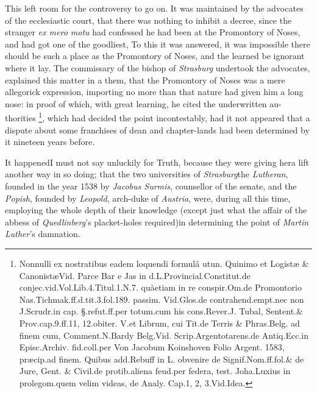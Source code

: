 \documentclass{article}
\begin{document}
This left room for the controversy to go on. It was maintained by the advocates
of the ecclesiastic court, that there was nothing to inhibit a decree, since
the stranger \textit{ex mero motu} had confessed he had been at the Promontory of
Noses, and had got one of the goodliest, \etc\etc\break
\tsk To this
it was answered, it was impossible there should be such a place as the
Promontory of Noses, and the learned be ignorant where it lay. The commissary
of the bishop of \textit{Strasburg} undertook the\pb
advocates, explained this matter in a\break
{}
them, that the Promontory of Noses was
a mere allegorick expression, importing no more than that nature
had given him a long nose: in proof of which, with great learning, he cited the
underwritten au-\break
thorities \footnote{Nonnulli ex nostratibus eadem loquendi
formulâ utun. Quinimo et Logistæ \& Canonistæ\tsh Vid.\@
Parce Bar e Jas in d.\@ L.\@ Provincial.Constitut.\break de
conjec.\@ vid.\@ Vol.\@ Lib.\@ 4.\@ Titul.\@ 1.\@ N.\@ 7.\@
quà\break etiam in re conspir.\@ Om.\@ de Promontorio
Nas.\break Tichmak.\@ ff.\@ d.\@ tit.\@ 3.\@ fol.\@ 189.\@
passim. Vid.\@ Glos.\break de contrahend.\@ empt.\etc nec
non J.\@ Scrudr.\@ in cap.\break 
§.\@ refut.\@ ff.\@ per totum.\@ cum his cons.\@ Rever.\@ J.\break
Tubal, Sentent.\@ \& Prov.\@ cap.\@ 9.\@ ff.\@ 11, 12.\@ obiter.\break  
V.\@ et Librum, cui Tit.\@ de Terris \& Phras.\@ Belg.\break
ad finem cum, Comment.\@ N.\@ Bardy Belg.\@ Vid.\break
Scrip.\@ Argentotarens.\@ de Antiq.\@ Ecc.\@ in Episc.\@ Ar\-chiv.\@
fid.\@ coll.\@ per Von Jacobum Koinshoven Folio Argent.\@
1583, præcip.\@ ad finem.  Quibus add.\@ Rebuff in L.\@
obvenire de Signif.\@ Nom.\@ ff.\@ fol.\@ \& de Jure, Gent.\@
\& Civil.\@ de protib.\@ aliena feud.\@ per federa, test.\@
Joha.\@ Luxius in prolegom.\@ quem velim videas, de Analy.\@
Cap.\@ 1, 2, 3.\@ Vid.\@ Idea.},
which had decided the point\pb
incontestably, had it not appeared that a dispute
about some franchises of dean and chapter-lands had been determined by it
nineteen years before.

It happened\tsk I must not say unluckily for Truth, because
they were giving her\break a lift another way in so doing;
that the two universities of \textit{Strasburg}\tsk the
\textit{Luthe\-ran}, founded in the year 1538 by
\textit{Jacobus Surmis}, counsellor of the senate,\tsk
and\break
the \textit{Popish}, founded by \textit{Leopold}, arch-duke
of \textit{Austria}, were, during all this time, employing
the whole depth of their know\-ledge (except just what the
affair of the abbess of \textit{Quedlinberg}’s placket-holes
required)\tsh in determining the point of \textit{Martin
Luther}’s damnation.
\end{document}
